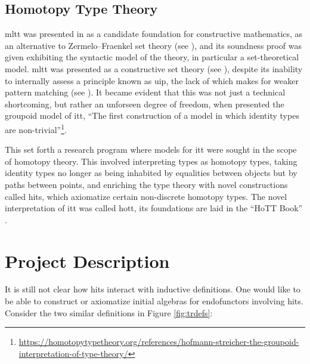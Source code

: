 \documentclass[a4paper]{article}
\begin{document}
\subsection{Homotopy Type Theory}

\Gls{mltt} was presented in \cite{MartinLoef1998} as a candidate foundation for constructive mathematics, as an alternative to Zermelo–Fraenkel set theory (see \cite[Introduction]{MartinLoef1998}), and its soundness proof was given exhibiting the syntactic model of the theory, in particular a set-theoretical model. \Gls{mltt} was presented as a constructive set theory (see \cite{Nordstroem1990}), despite its inability to internally assess a principle known as \gls{uip}, the lack of which makes for weaker pattern matching (see \textcite{Cockx2016}). It became evident that this was not just a technical shortcoming, but rather an unforseen degree of freedom, when \textcite{Hofmann1998} presented the groupoid model of \gls{itt}, ``The first construction of a model in which identity types are non-trivial''\footnote{\url{https://homotopytypetheory.org/references/hofmann-streicher-the-groupoid-interpretation-of-type-theory/}}.

This set forth a research program where models for \gls{itt} were sought in the scope of homotopy theory. This involved interpreting types as homotopy types, taking identity types no longer as being inhabited by equalities between objects but by paths between points, and enriching the type theory with novel constructions called \glspl{hit}, which axiomatize certain non-discrete homotopy types. The novel interpretation of \gls{itt} was called \gls{hott}, its foundations are laid in the ``HoTT Book'' \cite{UnivalentFoundationsProgram2013}.

\section{Project Description}

It is still not clear how \glspl{hit} interact with inductive definitions. One would like to be able to construct or axiomatize initial algebras for endofunctors involving \glspl{hit}. Consider the two similar definitions in Figure \ref{fig:trdefs}:
\end{document}
